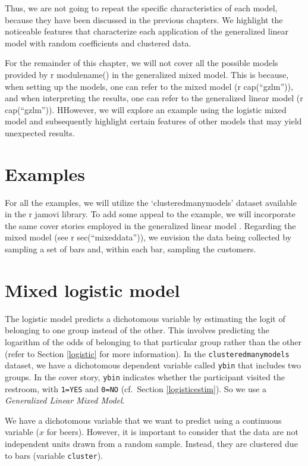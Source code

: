 \documentclass[
]{book}
\begin{document}
Thus, we are not going to repeat the specific characteristics of each model, because they have been discussed in the previous chapters. We highlight the noticeable features that characterize each application of the generalized linear model with random coefficients and clustered data.

For the remainder of this chapter, we will not cover all the possible models provided by r modulename() in the generalized mixed model. This is because, when setting up the models, one can refer to the mixed model (r cap(``gzlm'')), and when interpreting the results, one can refer to the generalized linear model (r cap(``gzlm'')). HHowever, we will explore an example using the logistic mixed model and subsequently highlight certain features of other models that may yield unexpected results.

\hypertarget{examples}{%
\section{Examples}\label{examples}}

For all the examples, we will utilize the `clusteredmanymodels' dataset available in the r jamovi library. To add some appeal to the example, we will incorporate the same cover stories employed in the generalized linear model . Regarding the mixed model (see r sec(``mixeddata'')), we envision the data being collected by sampling a set of bars and, within each bar, sampling the customers.

\hypertarget{mixed-logistic-model}{%
\section{Mixed logistic model}\label{mixed-logistic-model}}

The logistic model predicts a dichotomous variable by estimating the logit of belonging to one group instead of the other. This involves predicting the logarithm of the odds of belonging to that particular group rather than the other (refer to Section \ref{logistic} for more information). In the \texttt{clusteredmanymodels} dataset, we have a dichotomous dependent variable called \texttt{ybin} that includes two groups. In the cover story, \texttt{ybin} indicates whether the participant visited the restroom, with \texttt{1=YES} and \texttt{0=NO} (cf.~Section \ref{logisticestim}). So we use a \emph{Generalized Linear Mixed Model}.

We have a dichotomous variable that we want to predict using a continuous variable (\(x\) for beers). However, it is important to consider that the data are not independent units drawn from a random sample. Instead, they are clustered due to bars (variable \texttt{cluster}).
\end{document}
